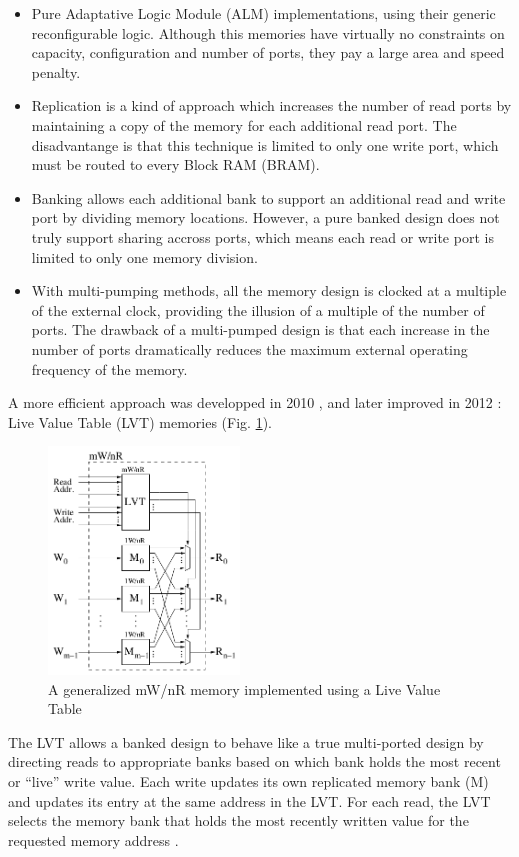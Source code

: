 \documentclass[conference,a4paper]{IEEEtran}
\begin{document}
\begin{itemize}
  \item Pure Adaptative Logic Module (ALM) implementations, using their generic reconfigurable logic. Although this memories have virtually no constraints on capacity, configuration and number of ports, they pay a large area and speed penalty.
  \item Replication is a kind of approach which increases the number of read ports by maintaining a copy of the memory for each additional read port. The disadvantange is that this technique is limited to only one write port, which must be routed to every Block RAM (BRAM).
  \item Banking allows each additional bank to support an additional read and write port by dividing memory locations. However, a pure banked design does not truly support sharing accross ports, which means each read or write port is limited to only one memory division.
  \item With multi-pumping methods, all the memory design is clocked at a multiple of the external clock, providing the illusion of a multiple of the number of ports. The drawback of a multi-pumped design is that each increase in the number of ports dramatically reduces the maximum external operating frequency of the memory.
\end{itemize}

A more efficient approach was developped in 2010 \cite{LaForest}, and later improved in 2012 \cite{LaForestXOR}: Live Value Table (LVT) memories (Fig. \ref{lvt}).

\begin{figure}[h]
\centering
\includegraphics[width=2.0in]{lvt}
\caption{A generalized mW/nR memory implemented using a Live Value Table}
\label{lvt}
\end{figure}

The LVT allows a banked design to behave like a true multi-ported design by directing reads to appropriate banks based on which bank holds the most recent or “live” write value. Each write updates its own replicated memory bank (M) and updates its entry at the same address in the LVT. For each read, the LVT selects the memory bank that holds the most recently written value for the requested memory address \cite{LaForest}.
\end{document}
